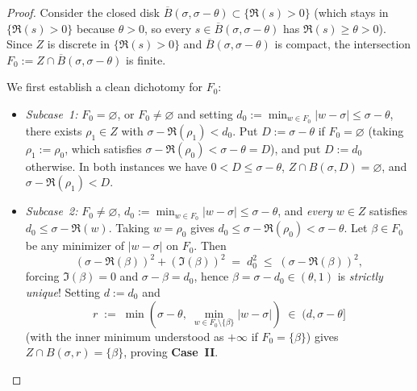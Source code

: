 \begin{proof}
Consider the closed disk $\overline{B}(\sigma, \sigma - \theta) \subset \{\Re(s) > 0\}$ (which stays in $\{\Re(s) > 0\}$ because $\theta > 0$, so every $s \in \overline{B}(\sigma, \sigma - \theta)$ has $\Re(s) \ge \theta > 0$). Since $Z$ is discrete in $\{\Re(s) > 0\}$ and $\overline{B}(\sigma, \sigma - \theta)$ is compact, the intersection $F_0 := Z \cap \overline{B}(\sigma, \sigma - \theta)$ is finite.

We first establish a clean dichotomy for $F_0$:
\begin{itemize}
\item \emph{Subcase~1:} $F_0 = \varnothing$, or $F_0 \neq \varnothing$ and setting $d_0 := \min_{w \in F_0} |w - \sigma| \le \sigma - \theta$, there exists $\rho_1 \in Z$ with $\sigma - \Re(\rho_1) < d_0$. Put $D := \sigma - \theta$ if $F_0 = \varnothing$ (taking $\rho_1 := \rho_0$, which satisfies $\sigma - \Re(\rho_0) < \sigma - \theta = D$), and put $D := d_0$ otherwise. In both instances we have $0 < D \le \sigma - \theta$, $Z \cap B(\sigma, D) = \varnothing$, and $\sigma - \Re(\rho_1) < D$.
\item \emph{Subcase~2:} $F_0 \neq \varnothing$, $d_0 := \min_{w \in F_0} |w - \sigma| \le \sigma - \theta$, and \emph{every} $w \in Z$ satisfies $d_0 \le \sigma - \Re(w)$. Taking $w = \rho_0$ gives $d_0 \le \sigma - \Re(\rho_0) < \sigma - \theta$. Let $\beta \in F_0$ be any minimizer of $|w - \sigma|$ on $F_0$. Then
  \[
    (\sigma - \Re(\beta))^2 + (\Im(\beta))^2 \;=\; d_0^2 \;\le\; (\sigma - \Re(\beta))^2,
  \]
  forcing $\Im(\beta) = 0$ and $\sigma - \beta = d_0$, hence $\beta = \sigma - d_0 \in (\theta, 1)$ is \emph{strictly unique}! Setting $d := d_0$ and
  \[
    r \;:=\; \min\!\left(\sigma - \theta,\; \min_{w \in F_0 \setminus \{\beta\}} |w - \sigma|\right) \;\in\; (d, \sigma - \theta]
  \]
  (with the inner minimum understood as $+\infty$ if $F_0 = \{\beta\}$) gives $Z \cap B(\sigma, r) = \{\beta\}$, proving \textbf{Case~II}.
\end{itemize}


\end{proof}
